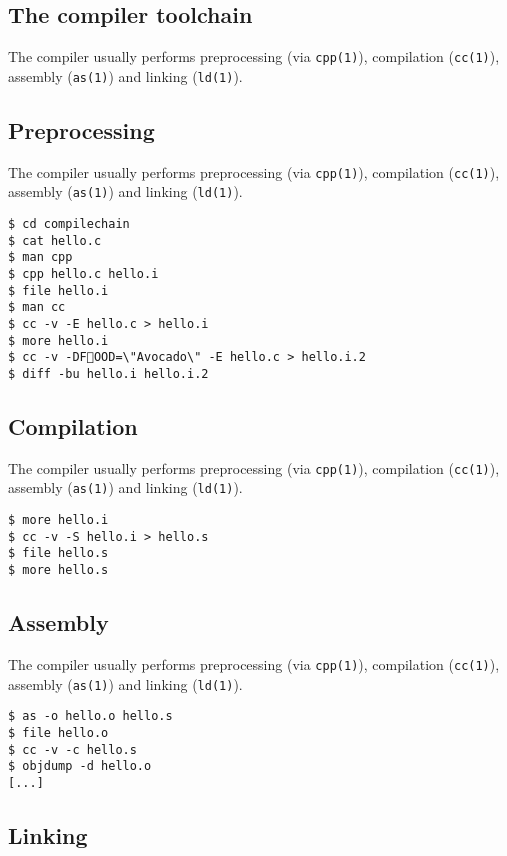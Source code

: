 \documentclass[xga]{xdvislides}
\begin{document}
\subsection{The compiler toolchain}

The compiler usually performs preprocessing (via {\tt cpp(1)}), compilation
({\tt cc(1)}), assembly ({\tt as(1)}) and linking ({\tt ld(1)}).

\subsection{Preprocessing}

The compiler usually performs preprocessing (via {\tt cpp(1)}), compilation
({\tt cc(1)}), assembly ({\tt as(1)}) and linking ({\tt ld(1)}).

\begin{verbatim}
$ cd compilechain
$ cat hello.c
$ man cpp
$ cpp hello.c hello.i
$ file hello.i
$ man cc
$ cc -v -E hello.c > hello.i
$ more hello.i
$ cc -v -DFOOD=\"Avocado\" -E hello.c > hello.i.2
$ diff -bu hello.i hello.i.2
\end{verbatim}

\subsection{Compilation}

The compiler usually performs preprocessing (via {\tt cpp(1)}), compilation
({\tt cc(1)}), assembly ({\tt as(1)}) and linking ({\tt ld(1)}).

\begin{verbatim}
$ more hello.i
$ cc -v -S hello.i > hello.s
$ file hello.s
$ more hello.s
\end{verbatim}

\subsection{Assembly}

The compiler usually performs preprocessing (via {\tt cpp(1)}), compilation
({\tt cc(1)}), assembly ({\tt as(1)}) and linking ({\tt ld(1)}).

\begin{verbatim}
$ as -o hello.o hello.s
$ file hello.o
$ cc -v -c hello.s
$ objdump -d hello.o
[...]
\end{verbatim}

\subsection{Linking}
\end{document}
